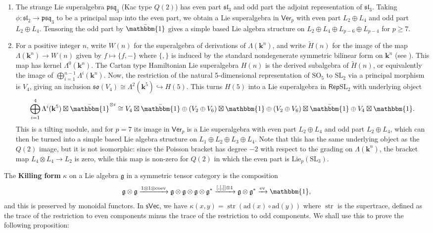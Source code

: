 \documentclass[11pt,a4paper,reqno]{amsart}
\theoremstyle{definition}
\newcommand{\bk}{\mathbf{k}}
\numberwithin{equation}{section}
\newcommand{\ev}{\mathrm{ev}}
\newcommand{\coev}{\mathrm{coev}}
\newcommand{\Ver}{\mathsf{Ver}}
\newcommand{\Rep}{\mathsf{Rep}}
\newcommand{\unit}{{\mathbbm{1}}}
\newcommand{\fg}{\mathfrak{g}}
\newcommand{\fsl}{\mathfrak{sl}}
\newcommand{\fso}{\mathfrak{so}}
\newcommand{\Lie}{\mathrm{Lie}}
\newcommand{\sVec}{\mathsf{sVec}}
\newcommand{\ad}{\mathrm{ad}}
\newcommand{\SL}{\mathrm{SL}}
\newcommand{\SO}{\mathrm{SO}}
\begin{document}
\begin{enumerate}
\item The strange Lie superalgebra $\mathfrak{psq}_3$ (Kac type $Q(2)$) has even part $\fsl_3$ and odd part the adjoint representation of $\fsl_3$. Taking $\phi:\fsl_2\to\mathfrak{psq}_3$ to be a principal map into the even part, we obtain a Lie superalgebra in $\Ver_p$ with even part $L_2\oplus L_4$ and odd part $L_2\oplus L_4$. Tensoring the odd part by $\bar\unit$ gives a simple based Lie algebra structure on $L_2\oplus L_4\oplus L_{p-6}\oplus L_{p-4}$ for $p\geq7$.
\item For a positive integer $n$, write $W(n)$ for the superalgebra of derivations of $\Lambda(\bk^n)$, and write $\widetilde{H}(n)$ for the image of the map $\Lambda(\bk^n)\to W(n)$ given by $f\mapsto\{f,-\}$ where $\{,\}$ is induced by the standard nondegenerate symmetric bilinear form on $\bk^n$ (see \cite[\S 3.3.2]{Kac}). This map has kernel $\Lambda^0(\bk^n)$. The Cartan type Hamiltonian Lie superalgebra $H(n)$ is the derived subalgebra of $\widetilde H(n)$, or equivalently the image of $\bigoplus_{i=1}^{n-1}\Lambda^i(\bk^n)$. Now, the restriction of the natural 5-dimensional representation of $\SO_5$ to $\SL_2$ via a principal morphism is $V_4$, giving an inclusion $\fso(V_4)\cong\Lambda^2(\bk^5)\hookrightarrow H(5)$. This turns $H(5)$ into a Lie superalgebra in $\Rep\SL_2$ with underlying object
\[\bigoplus_{i=1}^4\Lambda^i(\bk^5)\boxtimes\bar\unit^{\otimes i}\cong V_4\boxtimes\bar\unit\oplus(V_2\oplus V_6)\boxtimes\unit\oplus(V_2\oplus V_6)\boxtimes\bar\unit\oplus V_4\boxtimes\unit.\]
This is a tilting module, and for $p=7$ its image in $\Ver_p$ is a Lie superalgebra with even part $L_2\oplus L_4$ and odd part $L_2\oplus L_4$, which can then be turned into a simple based Lie algebra structure on $L_1\oplus L_2\oplus L_3\oplus L_4$. Note that this has the same underlying object as the $Q(2)$ image, but it is not isomorphic: since the Poisson bracket has degree $-2$ with respect to the grading on $\Lambda(\bk^n)$, the bracket map $L_4\otimes L_4\to L_2$ is zero, while this map is non-zero for $Q(2)$ in which the even part is $\Lie_p(\SL_3)$.
\end{enumerate}

The \textbf{Killing form} $\kappa$ on a Lie algebra $\fg$ in a symmetric tensor category is the composition
\[\fg\otimes\fg\xrightarrow{1\otimes1\otimes\coev}\fg\otimes\fg\otimes\fg\otimes\fg^*\xrightarrow{[,[,]]\otimes1}\fg\otimes\fg^*\xrightarrow{\ev}\unit,\]
and this is preserved by monoidal functors. In $\sVec$, we have $\kappa(x,y)=\operatorname{str}(\ad(x)\circ\ad(y))$ where $\operatorname{str}$ is the supertrace, defined as the trace of the restriction to even components minus the trace of the restriction to odd components. We shall use this to prove the following proposition:
\end{document}
